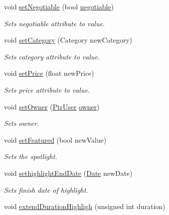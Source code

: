 \begin{DoxyCompactItemize}
void \hyperlink{class_advertisement_a99c97180458c86d517cbbf35d960994f}{set\+Negotiable} (bool \hyperlink{class_advertisement_a34021160ad144fefd9df9a30d19bd895}{negotiable})
\begin{DoxyCompactList}\small\item\em Sets negotiable attribute to value. \end{DoxyCompactList}\item 
void \hyperlink{class_advertisement_ad9ba4dc7b74aea1e4bdd12d60322453c}{set\+Category} (Category new\+Category)
\begin{DoxyCompactList}\small\item\em Sets category attribute to value. \end{DoxyCompactList}\item 
void \hyperlink{class_advertisement_af47b69a36414d09f24bc2e9173e4ab8b}{set\+Price} (float new\+Price)
\begin{DoxyCompactList}\small\item\em Sets price attribute to value. \end{DoxyCompactList}\item 
void \hyperlink{class_advertisement_aa814cf6e2055d5b53d8b56849c55fb4c}{set\+Owner} (\hyperlink{class_ptr_user}{Ptr\+User} \hyperlink{class_advertisement_abcb6446847bfd1880be9c854c4442313}{owner})
\begin{DoxyCompactList}\small\item\em Sets owner. \end{DoxyCompactList}\item 
void \hyperlink{class_advertisement_aed9b87fa4c1129ee26789662da6259c7}{set\+Featured} (bool new\+Value)
\begin{DoxyCompactList}\small\item\em Sets the spotlight. \end{DoxyCompactList}\item 
void \hyperlink{class_advertisement_af8616fa5d3a5c0c0f605d33299609080}{sethighlight\+End\+Date} (\hyperlink{class_date}{Date} new\+Date)
\begin{DoxyCompactList}\small\item\em Sets finish date of highlight. \end{DoxyCompactList}\item 
\hypertarget{class_advertisement_ad73071a166ba91edf80719806646dda7}{}void \hyperlink{class_advertisement_ad73071a166ba91edf80719806646dda7}{extend\+Duration\+Highligh} (unsigned int duration)\label{class_advertisement_ad73071a166ba91edf80719806646dda7}


\end{DoxyCompactItemize}
